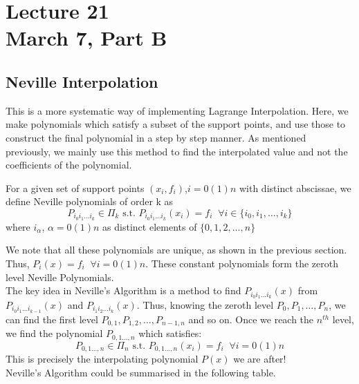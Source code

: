 \chapter*{Lecture 21\\March 7, Part B}
\setcounter{chapter}{4}

\section{Neville Interpolation}
This is a more systematic way of implementing Lagrange Interpolation. Here, we make polynomials which satisfy a subset of the support points, and use those to construct the final polynomial in a step by step manner. As mentioned previously, we mainly use this method to find the interpolated value and not the coefficients of the polynomial.\\

\begin{defn}
    For a given set of support points $(x_i,f_i)$,$i = 0(1)n$ with distinct abscissae, we define Neville polynomials of order k as
    $$P_{i_0i_1\dots i_k} \in \Pi_k \text{    s.t.    } P_{i_0i_1\dots i_k}(x_i) = f_i\;\;\forall i \in \{i_0,i_1,\dots,i_k\}$$
    where $i_\alpha$, $\alpha = 0(1)n $ as distinct elements of $\{0,1,2,\dots,n\}$
\end{defn}

We note that all these polynomials are unique, as shown in the previous section.\\
Thus, $P_{i}(x) = f_{i}\;\;\forall i = 0(1)n$. These constant polynomials form the zeroth level  Neville Polynomials.\\
The key idea in Neville's Algorithm is a method to find $P_{i_0i_1\dots i_k}(x)$ from $P_{i_0i_1\dots i_{k-1}}(x)$ and $P_{i_1i_2\dots i_k}(x)$. Thus, knowing the zeroth level $P_0, P_1,\dots, P_n$, we can find the first level $P_{0,1}, P_{1,2},\dots, P_{n-1,n}$ and so on. Once we reach the $n^{th}$ level, we find the polynomial $P_{0,1\dots, n}$ which satisfies:
$$P_{0,1\dots, n} \in \Pi_n \text{    s.t.    } P_{0,1\dots, n}(x_i) = f_i\;\;\forall i = 0(1)n $$
This is precisely the interpolating polynomial $P(x)$ we are after!\\[0.2 cm]
Neville's Algorithm could be summarised in the following table.\\[0.2 cm]


